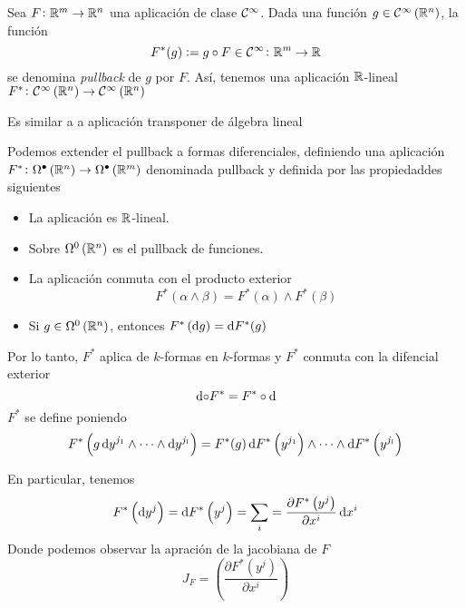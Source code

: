 \begin{defi}
    Sea $F \colon \mathbb{R}^m \to \mathbb{R}^n$ una aplicación de clase $\mathcal{C}^\infty$. Dada una función $g \in \mathcal{C}^\infty\left( \mathbb{R}^n \right)$, la función
    \[
        F^\ast(g) := g \circ F \in \mathcal{C}^\infty \colon \mathbb{R}^m \to \mathbb{R}
    \]
    se denomina \emph{pullback} de $g$ por $F$. Así, tenemos una aplicación $\mathbb{R}$-lineal $F^\ast \colon \mathcal{C}^\infty \left( \mathbb{R}^n \right)
    \to \mathcal{C}^\infty \left( \mathbb{R}^n \right)$
\end{defi}
\begin{obs*}
    Es similar a a aplicación transponer de álgebra lineal
\end{obs*}

\begin{defi}
    Podemos extender el pullback a formas diferenciales, definiendo una aplicación $F^\ast \colon \Omega^\bullet \left( \mathbb{R}^n \right) \to
    \Omega^\bullet\left( \mathbb{R}^m \right)$ denominada pullback y definida por las propiedaddes siguientes
    \begin{itemize}
        \item La aplicación es $\mathbb{R}$-lineal.
        \item Sobre $\Omega^0\left( \mathbb{R}^n \right)$ es el pullback de funciones.
        \item La aplicación conmuta con el producto exterior
            \[
                F^\ast(\alpha \wedge \beta) = F^\ast(\alpha) \wedge F^\ast(\beta)
            \]
        \item Si $g \in \Omega^0 \left( \mathbb{R}^n \right)$, entonces $F^\ast\left( \dif g \right) = \dif F^\ast(g)$
    \end{itemize}
    Por lo tanto, $F^\ast$ aplica de $k$-formas en $k$-formas y $F^\ast$ conmuta con la difencial exterior
    \[
        \dif \circ F^\ast = F^\ast \circ \dif
    \]
    $F^\ast$ se define poniendo
    \[
        F^\ast\left( g \dif y^{j_1} \wedge \cdots \wedge \dif y^{j_l} \right) = F^\ast(g)\dif F^\ast\left( y^{j_1} \right) \wedge
        \cdots \wedge \dif F^\ast\left( y^{j_l} \right)
    \]
\end{defi}

\begin{obs}
    En particular, tenemos
    \[
        F^\ast \left( \dif y^j \right) = \dif F^\ast\left( y^j \right) =
        \sum_i = \frac{\partial F^\ast\left( y^j \right)}{\partial x^i} \dif x^i
    \]
    Donde podemos observar la apración de la jacobiana de $F$
    \[
        J_F = \left( \frac{\partial F^\ast \left( y^j \right)}{\partial x^i} \right)
    \]
\end{obs}

